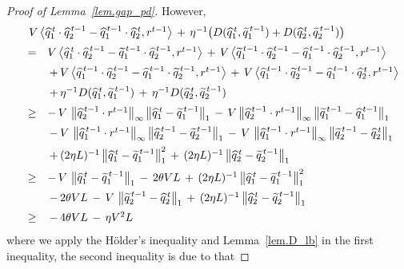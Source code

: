 \documentclass[12pt, final]{l4dc2023}
\begin{document}
\begin{proof}[Proof of Lemma~\ref{lem.gap_pd}]
	However,
	\[
	\begin{array}{rcl}
	&& \!\!\!\! \!\!\!\! \!\! V\, \big\langle{\hat q_1^{\,t}\cdot \hat q_2^{\,t-1}- \hat q_1^{\,t-1}\cdot \hat q_2^{\,t}},{r^{t-1}}\big\rangle 
	\,+\, \eta^{-1} \big(D(\hat q_1^{\,t},\tilde q_1^{\,t-1}) + D(\hat q_2^{\,t}, \tilde q_2^{\,t-1})\big)
	\\[0.2cm]
	&=& V\, \big\langle{\hat q_1^{\,t}\cdot \hat q_2^{\,t-1}- \tilde q_1^{\,t-1}\cdot \hat q_2^{\,t-1}},{r^{t-1}}\big\rangle 
	\,+\,V\, \big\langle{ \tilde q_1^{\,t-1}\cdot \hat q_2^{\,t-1} - \hat q_1^{\,t-1}\cdot \hat q_2^{\,t-1}},{r^{t-1}}\big\rangle 
	\\[0.2cm]
	&&  
	\,+\,V\, \big\langle{ \hat q_1^{\,t-1}\cdot \hat q_2^{\,t-1} - \hat q_1^{\,t-1}\cdot \tilde q_2^{\,t-1}},{r^{t-1}}\big\rangle 
	\,+\, V\, \big\langle{\hat q_1^{\,t-1}\cdot \tilde q_2^{\,t-1}- \hat q_1^{\,t-1}\cdot \hat q_2^{\,t}},{r^{t-1}}\big\rangle 
	\\[0.2cm]
	&&  \,+\, \eta^{-1} D(\hat q_1^{\,t},\tilde q_1^{\,t-1}) \,+\, \eta^{-1} D(\hat q_2^{\,t}, \tilde q_2^{\,t-1})
	\\[0.2cm]
	&\geq&  -\,V\, \norm{\hat q_2^{\,t-1}\cdot r^{t-1} }_\infty \norm{\hat q_1^{\,t} - \tilde q_1^{\,t-1}}_1
	\,-\,V\norm{ \hat q_2^{\,t-1} \cdot r^{t-1} }_\infty\norm{ \tilde q_1^{\,t-1}- \hat q_1^{\,t-1}}_1
	\\[0.2cm]
	&& 
	\,-\,V\,\norm{ \hat q_1^{\,t-1}\cdot  r^{t-1} }_\infty\norm{ \hat q_2^{\,t-1} - \tilde q_2^{\,t-1}}_1
	\,-\, V\,\norm{ \hat q_1^{\,t-1}\cdot r^{t-1} }_\infty\norm{ \tilde q_2^{\,t-1}-\hat q_2^{\,t} }_1
	\\[0.2cm]
	&& \,+\, (2\eta L)^{-1}\norm{\hat q_1^{\,t}-\tilde q_1^{\,t-1}}_1^2 \,+\, (2\eta L)^{-1} \norm{\hat q_2^{\,t} - \tilde q_2^{\,t-1}}_1
	\\[0.2cm]
	&\geq&  -\,V\, \norm{\hat q_1^{\,t} - \tilde q_1^{\,t-1}}_1
	\,-\, 2\theta V L
	\,+\, (2\eta L)^{-1}\norm{\hat q_1^{\,t}-\tilde q_1^{\,t-1}}_1^2
	\\[0.2cm]
	&& 
	\,-\,2\theta VL
	\,-\, V\,\norm{ \tilde q_2^{\,t-1}-\hat q_2^{\,t} }_1
	\,+\, (2\eta L)^{-1} \norm{\hat q_2^{\,t} - \tilde q_2^{\,t-1}}_1
	\\[0.2cm]
	&\geq& \,-\,4\theta V L\,-\,\eta V^2 L
	\end{array}
	\]
	where we apply the H\"older's inequality and Lemma~\ref{lem.D_lb} in the first inequality, the second inequality is due to that

\end{proof}
\end{document}
